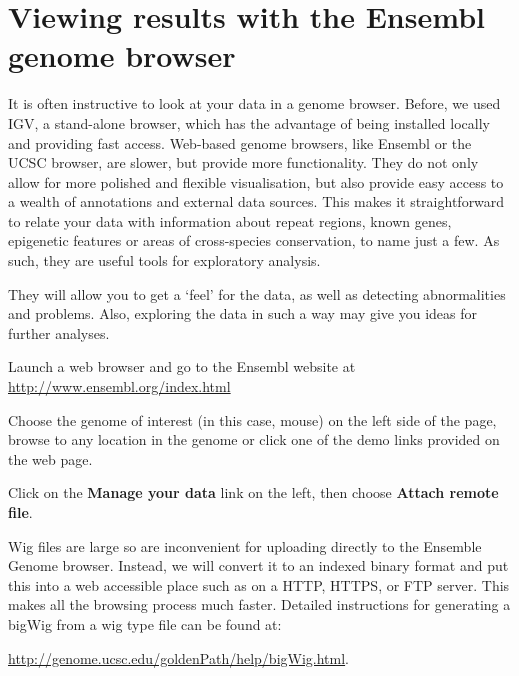 \section{Viewing results with the Ensembl genome browser}

\begin{information}
It is often instructive to look at your data in a genome browser. Before, we
used IGV, a stand-alone browser, which has the advantage of being installed
locally and providing fast access. Web-based genome browsers, like Ensembl or
the UCSC browser, are slower, but provide more functionality. They do not only
allow for more polished and flexible visualisation, but also provide easy access
to a wealth of annotations and external data sources. This makes it
straightforward to relate your data with information about repeat regions, known
genes, epigenetic features or areas of cross-species conservation, to name just
a few. As such, they are useful tools for exploratory analysis.

They will allow you to get a `feel' for the data, as well as detecting
abnormalities and problems. Also, exploring the data in such a way may give you
ideas for further analyses.
\end{information}

\begin{steps}
Launch a web browser and go to the Ensembl website at
\url{http://www.ensembl.org/index.html}

Choose the genome of interest (in this case, mouse) on the left side of the
page, browse to any location in the genome or click one of the demo links
provided on the web page.

Click on the \textbf{Manage your data} link on the left, then choose
\textbf{Attach remote file}.

\end{steps}

\begin{note}
Wig files are large so are inconvenient for uploading directly to the Ensemble Genome browser. Instead, we will convert it to an indexed binary format
and put this into a web accessible place such as on a HTTP, HTTPS, or FTP server.
This makes all the browsing process much faster. Detailed
instructions for generating a bigWig from a wig type file can be found at:

\url{http://genome.ucsc.edu/goldenPath/help/bigWig.html}.

\end{note}

